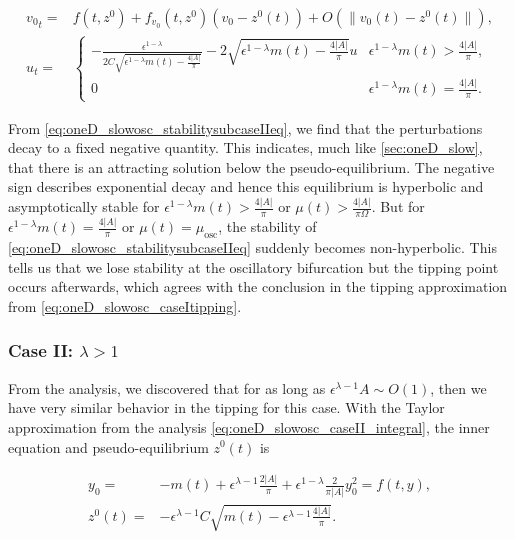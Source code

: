 \begin{equation}\label{eq:oneD_slowosc_stabilitysubcaseIIeq}
\begin{aligned}
{v_0}_t =& f(t,z^0)+f_{v_0}(t,z^0)(v_0-z^0(t))+O(\lVert v_0(t)-z^0(t) \rVert),\\
u_t =&\begin{cases}
-\frac{\epsilon^{1-\lambda}}{2C\sqrt{\epsilon^{1-\lambda}m(t)-\frac{4|A|}{\pi}}}-2\sqrt{\epsilon^{1-\lambda}m(t)-\frac{4|A|}{\pi}} u & \epsilon^{1-\lambda}m(t)>\frac{4|A|}{\pi},\\
0 & \epsilon^{1-\lambda}m(t)=\frac{4|A|}{\pi}.
\end{cases}
\end{aligned}
\end{equation}

From \eqref{eq:oneD_slowosc_stabilitysubcaseIIeq}, we find that the perturbations decay to a fixed negative quantity. This indicates, much like \autoref{sec:oneD_slow}, that there is an attracting solution below the pseudo-equilibrium. The negative sign describes exponential decay and hence this equilibrium is hyperbolic and asymptotically stable for $\epsilon^{1-\lambda}m(t)>\frac{4|A|}{\pi}$ or $\mu(t)>\frac{4|A|}{\pi \Omega}$. But for $\epsilon^{1-\lambda}m(t)=\frac{4|A|}{\pi}$ or $\mu(t) =\mu_{\text{osc}}$, the stability of \eqref{eq:oneD_slowosc_stabilitysubcaseIIeq} suddenly becomes non-hyperbolic. This tells us that we lose stability at the oscillatory bifurcation but the tipping point occurs afterwards, which agrees with the conclusion in the tipping approximation from \eqref{eq:oneD_slowosc_caseItipping}.

\subsubsection{Case II: $\lambda>1$}

From the analysis, we discovered that for as long as $\epsilon^{\lambda-1}A\sim O(1)$, then we have very similar behavior in the tipping for this case. With the Taylor approximation from the analysis \eqref{eq:oneD_slowosc_caseII_integral}, the inner equation and pseudo-equilibrium $z^0(t)$ is

\begin{equation}\label{eq:oneD_slowosc_stabilitycaseII}
\begin{aligned}
y_0=&-m(t) +\epsilon^{\lambda-1}\frac{2|A|}{\pi}+\epsilon^{1-\lambda}\frac{2}{\pi |A|}y_0^2=f(t,y),\\
z^0(t)=&-\epsilon^{\lambda-1}C\sqrt{m(t)-\epsilon^{\lambda-1}\frac{4|A|}{\pi}}.
\end{aligned}
\end{equation}

